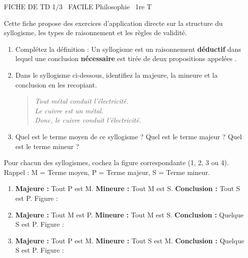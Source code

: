 \documentclass[11pt]{article}
\begin{document}
\begin{tcolorbox}[enhanced,colback=popink,colframe=popink,arc=10pt,boxrule=0pt,left=12pt,right=12pt,top=9pt,bottom=9pt]
{\color{white}\popxbold\small FICHE DE TD 1/3 \textbullet\ FACILE \hfill Philosophie \textbullet\ 1re T\par}
\end{tcolorbox}
\vspace{4pt}
Cette fiche propose des exercices d'application directe sur la structure du syllogisme, les types de raisonnement et les règles de validité.

\begin{exercice}
\begin{enumerate}
    \item Complétez la définition : Un syllogisme est un raisonnement \textbf{déductif} dans lequel une conclusion \textbf{nécessaire} est tirée de deux propositions appelées \underline{\hspace{5cm}}.
    \item Dans le syllogisme ci-dessous, identifiez la majeure, la mineure et la conclusion en les recopiant.
    \begin{quote}
    \textit{Tout métal conduit l'électricité.\\ Le cuivre est un métal.\\ Donc, le cuivre conduit l'électricité.}
    \end{quote}
    \item Quel est le terme moyen de ce syllogisme ? Quel est le terme majeur ? Quel est le terme mineur ?
\end{enumerate}
\end{exercice}

\begin{exercice}
Pour chacun des syllogismes, cochez la figure correspondante (1, 2, 3 ou 4). Rappel : M = Terme moyen, P = Terme majeur, S = Terme mineur.
\begin{enumerate}
    \item \textbf{Majeure :} Tout P est M. \quad \textbf{Mineure :} Tout M est S. \quad \textbf{Conclusion :} Tout S est P. \quad Figure :    
    \item \textbf{Majeure :} Tout M est P. \quad \textbf{Mineure :} Tout M est S. \quad \textbf{Conclusion :} Quelque S est P. \quad Figure :    
    \item \textbf{Majeure :} Tout P est M. \quad \textbf{Mineure :} Tout S est M. \quad \textbf{Conclusion :} Quelque S est P. \quad Figure :    
\end{enumerate}
\end{exercice}
\end{document}
